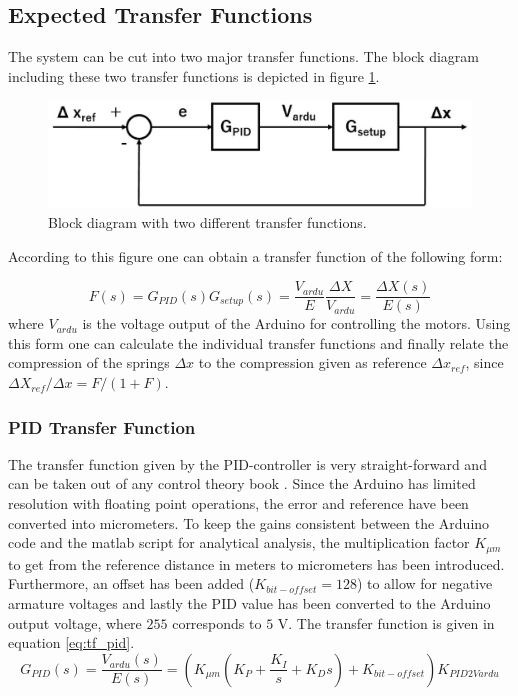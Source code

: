 \subsection{Expected Transfer Functions}
The system can be cut into two major transfer functions. The block diagram including these two transfer functions is depicted in figure \ref{fig:2tf_block_diagram}. 
	
\begin{figure}[h!]
	\centering
	\includegraphics[width=0.6\linewidth]{Figs/2tf_block_diagram}
	\caption{Block diagram with two different transfer functions.}
	\label{fig:2tf_block_diagram}
\end{figure}

According to this figure one can obtain a transfer function of the following form:

\begin{equation}
	F(s) = G_{PID}(s)G_{setup}(s) = \frac{V_{ardu}}{E}\frac{\Delta X}{V_{ardu}} = \frac{\Delta X(s)}{E(s)}
	\label{eq:complete_tf}
\end{equation}
where $V_{ardu}$ is the voltage output of the Arduino for controlling the motors. Using this form one can calculate the individual transfer functions and finally relate the compression of the springs $\Delta x$ to the compression given as reference $\Delta x_{ref}$, since $\Delta X_{ref} / \Delta x = F/(1+F)$.
	
\subsubsection{PID Transfer Function}
The transfer function given by the PID-controller is very straight-forward and can be taken out of any control theory book \cite{Dutton1997}. 
Since the Arduino has limited resolution with floating point operations, the error and reference have been converted into micrometers. To keep the gains consistent between the Arduino code and the matlab script for analytical analysis, the multiplication factor $K_{\mu m}$ to get from the reference distance in meters to micrometers has been introduced. Furthermore, an offset has been added ($K_{bit-offset} = 128$) to allow for negative armature voltages and lastly the PID value has been converted to the Arduino output voltage, where $255$ corresponds to $5$ V. The transfer function is given in equation \ref{eq:tf_pid}. 
\begin{equation}
	G_{PID} (s) = \frac{V_{ardu}(s)}{E(s)} = (K_{\mu m} (K_P + \frac{K_I}{s} + K_Ds) +K_{bit-offset}) K_{PID2Vardu}
	\label{eq:tf_pid}
\end{equation}

